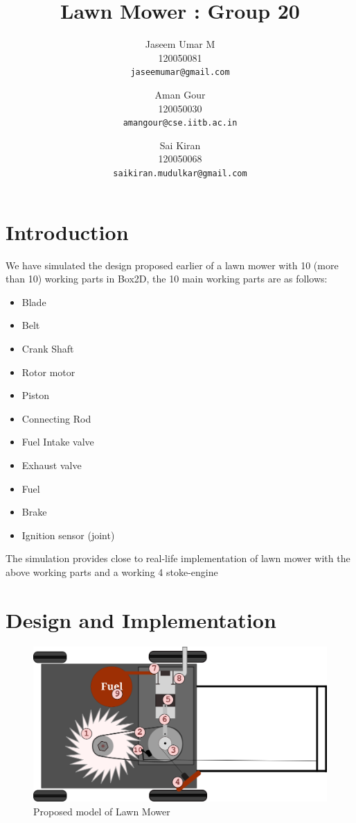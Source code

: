 \documentclass[12pt,a4paper]{report}
\title{Lawn Mower : Group 20}
\author{Jaseem Umar M\\ 120050081\\ \texttt{jaseemumar@gmail.com} \and
	Aman Gour\\ 120050030\\ \texttt{amangour@cse.iitb.ac.in}\and
    Sai Kiran \\120050068\\ \texttt{saikiran.mudulkar@gmail.com}
 }
\begin{document}
\maketitle
\section*{Introduction}

We have simulated the design proposed earlier of a lawn mower with 10 (more than 10) working parts in Box2D, the 10 main working parts are as follows:
\cite{box2d}
\\
\begin{itemize}
\item Blade 
\item Belt
 \item Crank Shaft 
 \item Rotor motor 
 \item Piston
\item Connecting Rod
\item Fuel Intake valve
\item Exhaust valve
\item Fuel
\item Brake
\item Ignition sensor (joint)
\end{itemize}

 The simulation provides close to real-life implementation of lawn mower with the above working parts and a working 4 stoke-engine \cite{Engine}
 \pagebreak

\section*{Design and Implementation}

\begin{figure}[htb]
\begin{center}
\includegraphics[scale= 0.8]{machine}
\caption{Proposed model of Lawn Mower}
\label{fig: image}
\end{center}
\end{figure}
\end{document}
